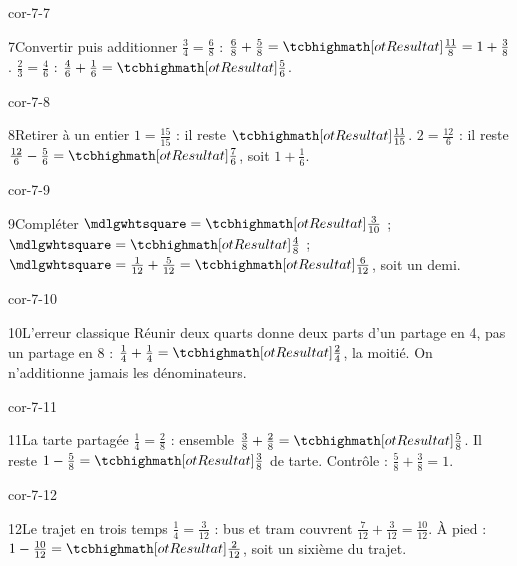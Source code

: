 \begin{blocLivre}{cor-7-7}\begin{corrige}{7}{Convertir puis additionner}
$\frac34=\frac68$ : $\frac68+\frac58=\res{\frac{11}8}=1+\frac38$. $\frac23=\frac46$ : $\frac46+\frac16=\res{\frac56}$.
\end{corrige}\end{blocLivre}
\begin{blocLivre}{cor-7-8}\begin{corrige}{8}{Retirer à un entier}
$1=\frac{15}{15}$ : il reste $\res{\frac{11}{15}}$. $2=\frac{12}6$ : il reste $\frac{12}6-\frac56=\res{\frac76}$, soit $1+\frac16$.
\end{corrige}\end{blocLivre}
\begin{blocLivre}{cor-7-9}\begin{corrige}{9}{Compléter}
$\square=\res{\frac3{10}}$ ; $\square=\res{\frac48}$ ; $\square=\frac1{12}+\frac5{12}=\res{\frac6{12}}$, soit un demi.
\end{corrige}\end{blocLivre}
\begin{blocLivre}{cor-7-10}\begin{corrige}{10}{L’erreur classique}
Réunir deux quarts donne deux parts d’un partage en 4, pas un partage en 8 : $\frac14+\frac14=\res{\frac24}$, la moitié. On n’additionne jamais les dénominateurs.
\end{corrige}\end{blocLivre}
\begin{blocLivre}{cor-7-11}\begin{corrige}{11}{La tarte partagée}
$\frac14=\frac28$ : ensemble $\frac38+\frac28=\res{\frac58}$. Il reste $1-\frac58=\res{\frac38}$ de tarte. Contrôle : $\frac58+\frac38=1$.
\end{corrige}\end{blocLivre}
\begin{blocLivre}{cor-7-12}\begin{corrige}{12}{Le trajet en trois temps}
$\frac14=\frac3{12}$ : bus et tram couvrent $\frac7{12}+\frac3{12}=\frac{10}{12}$. À pied : $1-\frac{10}{12}=\res{\frac2{12}}$, soit un sixième du trajet.
\end{corrige}\end{blocLivre}
